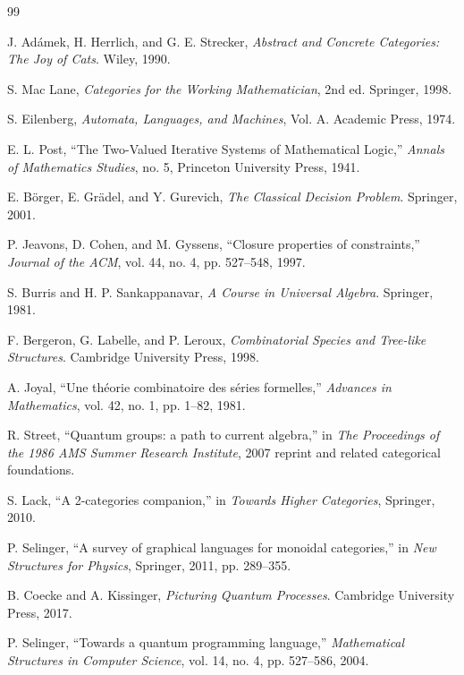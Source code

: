 \begin{thebibliography}{99}

 J. Ad\'{a}mek, H. Herrlich, and G. E. Strecker, \emph{Abstract and Concrete Categories: The Joy of Cats}. Wiley, 1990.

 S. Mac Lane, \emph{Categories for the Working Mathematician}, 2nd ed. Springer, 1998.

 S. Eilenberg, \emph{Automata, Languages, and Machines}, Vol. A. Academic Press, 1974. %

 E. L. Post, ``The Two-Valued Iterative Systems of Mathematical Logic,'' \emph{Annals of Mathematics Studies}, no. 5, Princeton University Press, 1941.

 E. B\"orger, E. Gr\"adel, and Y. Gurevich, \emph{The Classical Decision Problem}. Springer, 2001.

 P. Jeavons, D. Cohen, and M. Gyssens, ``Closure properties of constraints,'' \emph{Journal of the ACM}, vol. 44, no. 4, pp. 527--548, 1997.

 S. Burris and H. P. Sankappanavar, \emph{A Course in Universal Algebra}. Springer, 1981.

 F. Bergeron, G. Labelle, and P. Leroux, \emph{Combinatorial Species and Tree-like Structures}. Cambridge University Press, 1998.

 A. Joyal, ``Une th\'eorie combinatoire des s\'eries formelles,'' \emph{Advances in Mathematics}, vol. 42, no. 1, pp. 1--82, 1981.

 R. Street, ``Quantum groups: a path to current algebra,'' in \emph{The Proceedings of the 1986 AMS Summer Research Institute}, 2007 reprint and related categorical foundations.

 S. Lack, ``A 2-categories companion,'' in \emph{Towards Higher Categories}, Springer, 2010.

 P. Selinger, ``A survey of graphical languages for monoidal categories,'' in \emph{New Structures for Physics}, Springer, 2011, pp. 289--355.

 B. Coecke and A. Kissinger, \emph{Picturing Quantum Processes}. Cambridge University Press, 2017.

 P. Selinger, ``Towards a quantum programming language,'' \emph{Mathematical Structures in Computer Science}, vol. 14, no. 4, pp. 527--586, 2004.


\end{thebibliography}

